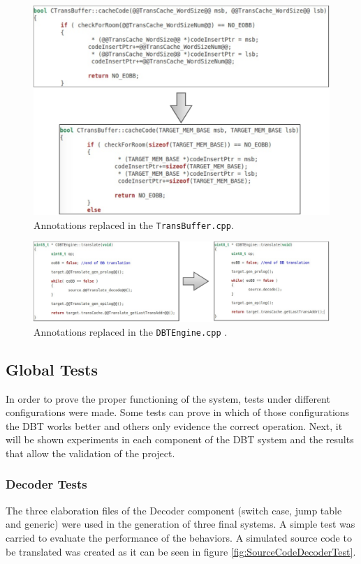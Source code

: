 \begin{figure}[H]
\centerline{
\includegraphics[scale=0.5]{images/annotation_test2}
}
\caption{Annotations replaced in the \texttt{TransBuffer.cpp}.}
\label{fig:annotation_test2}
\end{figure}

\begin{figure}[H]
\centerline{
\includegraphics[scale=0.5]{images/annotation_test3}
}
\caption{Annotations replaced in the \texttt{DBTEngine.cpp} .}
\label{fig:annotation_test3}
\end{figure}


\subsection{Global Tests}

In order to prove the proper functioning of the system, tests under different configurations were made. Some tests can prove in which of those configurations the DBT works better and others only evidence the correct operation. 
Next, it will be shown experiments in each component of the DBT system and the results that allow the validation of the project.

\subsubsection{Decoder Tests}
The three elaboration files of the Decoder component (switch case, jump table and generic) were used in the generation of three final systems. A simple test was carried to evaluate the performance of the behaviors. A simulated source code to be translated was created as it can be seen in figure \ref{fig:SourceCodeDecoderTest}.

